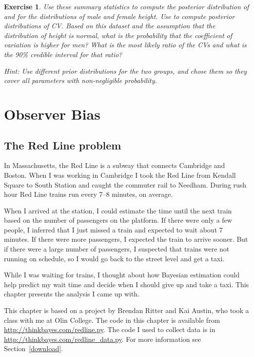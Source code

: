 \documentclass[12pt]{book}
\theoremstyle{exercise}
\newtheorem{exercise}{Exercise}[chapter]
\begin{document}
\begin{exercise}
Use these summary statistics to compute the posterior distribution of
 and  for the
distributions of male and female height. Use
 to compute posterior
distributions of CV. Based on this dataset and the assumption that the
distribution of height is normal, what is the probability that the
coefficient of variation is higher for men? What is the most likely
ratio of the CVs and what is the 90\% credible interval for that ratio?

Hint: Use different prior distributions for the two groups, and chose
them so they cover all parameters with non-negligible probability.

\end{exercise}


\chapter{Observer Bias}
\label{observer}

\section{The Red Line problem}

In Massachusetts, the Red Line is a subway that connects
Cambridge and Boston.  When I was working in Cambridge I took the Red
Line from Kendall Square to South Station and caught the commuter rail
to Needham.  During rush hour Red Line trains run every 7--8
minutes, on average.

When I arrived at the station, I could estimate the time until
the next train based on the number of passengers on the platform.
If there were only a few people, I inferred that I just missed
a train and expected to wait about 7 minutes.  If there were
more passengers, I expected the train to arrive sooner.  But if
there were a large number of passengers, I suspected that
trains were not running on schedule, so I would go back to the
street level and get a taxi.

While I was waiting for trains, I thought about how Bayesian
estimation could help predict my wait time and decide when I
should give up and take a taxi.  This chapter presents the
analysis I came up with.

This chapter is based on a project by Brendan Ritter and
Kai Austin, who took a class with me at Olin College.
The code in this chapter is available from
\url{http://thinkbayes.com/redline.py}.  The code I used
to collect data is in \url{http://thinkbayes.com/redline_data.py}.
  For more information
see Section~\ref{download}.
\end{document}
